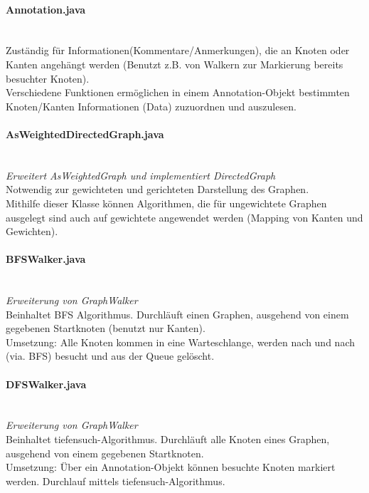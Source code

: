 \documentclass[10pt,a4paper]{article}
\begin{document}
\paragraph{Annotation.java}\ \\
Zuständig für Informationen(Kommentare/Anmerkungen), die an Knoten oder Kanten angehängt werden (Benutzt z.B. von Walkern zur Markierung bereits besuchter Knoten).\\
Verschiedene Funktionen ermöglichen in einem Annotation-Objekt bestimmten Knoten/Kanten Informationen (Data) zuzuordnen und auszulesen.\\

\paragraph{AsWeightedDirectedGraph.java}\ \\
\emph{Erweitert AsWeightedGraph und implementiert DirectedGraph}\\
Notwendig zur gewichteten und gerichteten Darstellung des Graphen.\\
Mithilfe dieser Klasse können Algorithmen, die für ungewichtete Graphen ausgelegt sind auch auf gewichtete angewendet werden (Mapping von Kanten und Gewichten).\\

\paragraph{BFSWalker.java}\ \\
\emph{Erweiterung von GraphWalker}\\
Beinhaltet BFS Algorithmus. Durchläuft einen Graphen, ausgehend von einem gegebenen Startknoten (benutzt nur Kanten).\\
Umsetzung: Alle Knoten kommen in eine Warteschlange, werden nach und nach (via. BFS) besucht und aus der Queue gelöscht.\\

\paragraph{DFSWalker.java}\ \\
\emph{Erweiterung von GraphWalker}\\
Beinhaltet tiefensuch-Algorithmus. Durchläuft alle Knoten eines Graphen, ausgehend von einem gegebenen Startknoten.\\
Umsetzung: Über ein Annotation-Objekt können besuchte Knoten markiert werden. Durchlauf mittels tiefensuch-Algorithmus.\\
\end{document}
